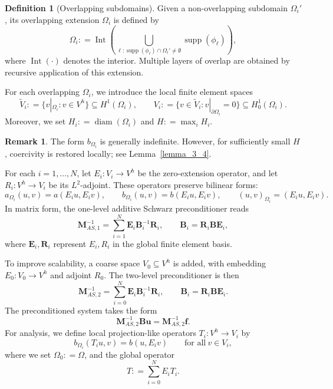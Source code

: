 \documentclass[preprint,3p,times]{elsarticle}
\newcommand{\assign}{\mathrel{\mathop:}=}
\theoremstyle{definition}
\newtheorem{remark}[theorem]{Remark}
\newtheorem{definition}[theorem]{Definition}
\numberwithin{equation}{section}
\begin{document}
\begin{definition}[Overlapping subdomains]\label{def:subdomains}
Given a non-overlapping subdomain $\Omega_i'$, its overlapping extension $\Omega_i$ is defined by
\[
	\Omega_i \assign \operatorname{Int}\left( \bigcup_{\ell : \operatorname{supp}(\phi_\ell) \cap \Omega_i' \neq \emptyset} \operatorname{supp}(\phi_\ell) \right),
\]
where $\operatorname{Int}(\cdot)$ denotes the interior. Multiple layers of overlap are obtained by recursive application of this extension.
\end{definition}
For each overlapping $\Omega_i$, we introduce the local finite element spaces
\begin{equation}\label{eq:local_spaces}
	\widetilde{V}_i \assign \{ v|_{\Omega_i} : v\in V^h \} \subseteq H^1(\Omega_i),
	\qquad
	V_i \assign \{ v\in \widetilde{V}_i : v|_{\partial \Omega_i}=0 \} \subseteq H^1_0(\Omega_i).
\end{equation}
Moreover, we set $H_i \assign \operatorname{diam}(\Omega_i)$ and $H \assign \max_i H_i$. 

\begin{remark}
The form $b_{\Omega_i}$ is generally indefinite.  However, for sufficiently small $H$, coercivity is restored locally; 
see Lemma~\ref{lemma_3_4}.
\end{remark}

For each $i=1,\dots,N$, let $E_i: V_i \to V^h$ be the zero-extension operator, and let $R_i: V^h \to V_i$ be its $L^2$-adjoint. These operators preserve bilinear forms:
\[
	a_{\Omega_i}(u,v) = a(E_i u, E_i v), \qquad
	b_{\Omega_i}(u,v) = b(E_i u, E_i v), \qquad
	(u,v)_{\Omega_i} = (E_i u, E_i v).
\]
In matrix form, the one-level additive Schwarz preconditioner reads
\begin{equation}\label{eq:AS1}
	\mathbf{M}^{-1}_{AS,1} = \sum_{i=1}^N \mathbf{E}_i \mathbf{B}_i^{-1} \mathbf{R}_i,
	\qquad \mathbf{B}_i = \mathbf{R}_i \mathbf{B} \mathbf{E}_i,
\end{equation}
where $\mathbf{E}_i,\mathbf{R}_i$ represent $E_i,R_i$ in the global finite element basis.

To improve scalability, a coarse space $V_0\subseteq V^h$ is added, with embedding $E_0:V_0\to V^h$ and adjoint $R_0$. The two-level preconditioner is then
\begin{equation}\label{eq:AS2}
	\mathbf{M}^{-1}_{AS,2} = \sum_{i=0}^N \mathbf{E}_i \mathbf{B}_i^{-1} \mathbf{R}_i,
	\qquad \mathbf{B}_i = \mathbf{R}_i \mathbf{B} \mathbf{E}_i.
\end{equation}
The preconditioned system takes the form
\begin{equation}\label{eq:precond_system}
	\mathbf{M}^{-1}_{AS,2}\mathbf{B}\mathbf{u} = \mathbf{M}^{-1}_{AS,2}\mathbf{f}.
\end{equation}
For analysis, we define local projection-like operators $T_i:V^h\to V_i$ by
\begin{equation}\label{eq:Ti}
	b_{\Omega_i}(T_i u,v) = b(u,E_i v) \qquad \text{for all} \ v\in V_i,
\end{equation}
where we set $\Omega_0\assign\Omega$,
and the global operator
\begin{equation}\label{eq:T}
	T \assign \sum_{i=0}^N E_i T_i.
\end{equation}
\end{document}
